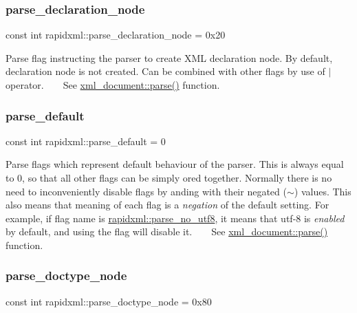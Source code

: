 \subsubsection{\texorpdfstring{parse\_declaration\_node}{parse\_declaration\_node}}
{\footnotesize\ttfamily const int rapidxml\+::parse\+\_\+declaration\+\_\+node = 0x20}

Parse flag instructing the parser to create X\+ML declaration node. By default, declaration node is not created. Can be combined with other flags by use of $\vert$ operator. ~\newline
~\newline
 See \mbox{\hyperlink{classrapidxml_1_1xml__document_ac6e73ff9ac323bf5a370c38feb03a6b1}{xml\+\_\+document\+::parse()}} function. \mbox{\label{namespacerapidxml_acf4edf952f59eb1b6124ea37ad7da3ab}} 
\subsubsection{\texorpdfstring{parse\_default}{parse\_default}}
{\footnotesize\ttfamily const int rapidxml\+::parse\+\_\+default = 0}

Parse flags which represent default behaviour of the parser. This is always equal to 0, so that all other flags can be simply ored together. Normally there is no need to inconveniently disable flags by anding with their negated ($\sim$) values. This also means that meaning of each flag is a {\itshape negation} of the default setting. For example, if flag name is \mbox{\hyperlink{namespacerapidxml_a22d4aefaceb00d7afabfef7107b108da}{rapidxml\+::parse\+\_\+no\+\_\+utf8}}, it means that utf-\/8 is {\itshape enabled} by default, and using the flag will disable it. ~\newline
~\newline
 See \mbox{\hyperlink{classrapidxml_1_1xml__document_ac6e73ff9ac323bf5a370c38feb03a6b1}{xml\+\_\+document\+::parse()}} function. \mbox{\label{namespacerapidxml_a41002b49780a90a0bbcc28ce8b895fe4}} 
\subsubsection{\texorpdfstring{parse\_doctype\_node}{parse\_doctype\_node}}
{\footnotesize\ttfamily const int rapidxml\+::parse\+\_\+doctype\+\_\+node = 0x80}


